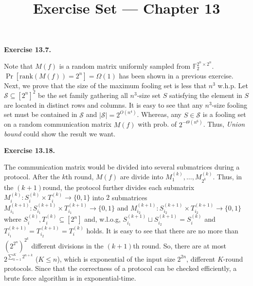 \documentclass[a4paper]{article}
\title{Exercise Set --- Chapter 13}
\date{}
\newenvironment{exercise}[1]{
	\par
	\noindent\textbf{Exercise #1.}\quad
}{
	\par
	\bigskip
}
\begin{document}
    \maketitle

    \begin{exercise}{13.7}
    	Note that $M(f)$ is a random matrix uniformly sampled from $\mathbb F_2^{2^n\times 2^n}$. $\Pr[\text{rank}(M(f)) = 2^n] = \Omega(1)$ has been shown in a previous exercise. Next, we prove that the size of the maximum fooling set is less that $n^3$ w.h.p. Let $\mathcal S \subseteq [2^n]^2$ be the set family gathering all $n^3$-size set $S$ satisfying the element in $S$ are located in distinct rows and columns. It is easy to see that any $n^3$-size fooling set must be contained in $\mathcal S$ and $|\mathcal S| = 2^{O(n^4)}$. Whereas, any $S \in \mathcal S$ is a fooling set on a random communication matrix $M(f)$ with prob. of $2^{-\Theta(n^6)}$. Thus, \emph{Union bound} could show the result we want.
    \end{exercise}

    \begin{exercise}{13.18}
    	The communication matrix would be divided into several submatrices during a protocol. After the $k$th round, $M(f)$ are divide into $M^{(k)}_1, \ldots, M^{(k)}_{2^k}$. Thus, in the $(k + 1)$round, the protocol further divides each submatrix $M_i^{(k)}: S_i^{(k)}\times T_i^{(k)} \to \{0, 1\}$ into $2$ submatrices $M_{i_1}^{(k + 1)}: S_{i_1}^{(k + 1)}\times T_{i_1}^{(k + 1)} \to \{0, 1\}$ and $M_{i_2}^{(k + 1)}: S_{i_2}^{(k + 1)}\times T_{i_2}^{(k + 1)} \to \{0, 1\}$ where $S_i^{(k)}, T_i^{(k)} \subseteq [2^n]$ and, w.l.o.g, $S_{i_1}^{(k + 1)} \sqcup S_{i_2}^{(k + 1)} = S_i^{(k)}$ and $T_{i_1}^{(k + 1)} = T_{i_2}^{(k + 1)} = T_i^{(k)}$ holds. It is easy to see that there are no more than $(2^{2^n})^{2^k}$ different divisions in the $(k+1)$th round. So, there are at most $2^{\sum_{k = 1}^K2^{n+k}}$ ($K \leq n$), which is exponential of the input size $2^{2n}$, different $K$-round protocols. Since that the correctness of a protocol can be checked efficiently, a brute force algorithm is in exponential-time.
    \end{exercise}
\end{document}
